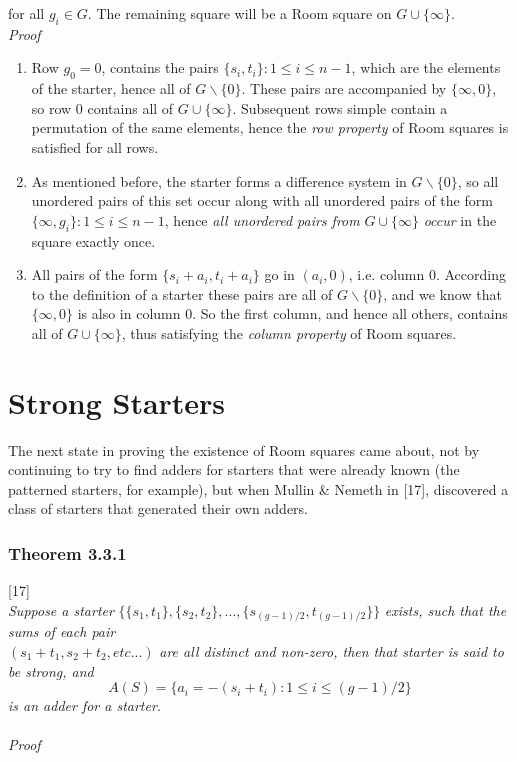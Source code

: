 \documentclass[
  12pt,
  a4paper]{book}
\begin{document}
for all \(g_i \in G\). The remaining square will be a Room square on
\(G \cup \{\infty\}\).\\
\emph{Proof}

\begin{enumerate}
\def\labelenumi{\arabic{enumi}.}
\item
  Row \(g_0=0\), contains the pairs \(\{s_i,t_i\}:1 \leq i \leq n-1\),
  which are the elements of the starter, hence all of
  \(G \backslash \{0\}\). These pairs are accompanied by
  \(\{\infty,0\}\), so row 0 contains all of \(G \cup \{\infty\}\).
  Subsequent rows simple contain a permutation of the same elements,
  hence the \emph{row property} of Room squares is satisfied for all
  rows.
\item
  As mentioned before, the starter forms a difference system in
  \(G \backslash \{0\}\), so all unordered pairs of this set occur along
  with all unordered pairs of the form
  \(\{\infty,g_i\}: 1 \leq i \leq n-1\), hence \emph{all unordered pairs
  from} \(G \cup \{\infty\}\) \emph{occur} in the square exactly once.
\item
  All pairs of the form \(\{s_i+a_i,t_i+a_i\}\) go in \((a_i,0)\), i.e.
  column 0. According to the definition of a starter these pairs are all
  of \(G \backslash \{0\}\), and we know that \(\{\infty,0\}\) is also
  in column 0. So the first column, and hence all others, contains all
  of \(G \cup \{\infty\}\), thus satisfying the \emph{column property}
  of Room squares.
\end{enumerate}

\hypertarget{strong-starters}{%
\section{Strong Starters}\label{strong-starters}}

The next state in proving the existence of Room squares came about, not
by continuing to try to find adders for starters that were already known
(the patterned starters, for example), but when Mullin \& Nemeth in
{[}17{]}, discovered a class of starters that generated their own
adders.

\hypertarget{theorem-3.3.1}{%
\subsubsection{Theorem 3.3.1}\label{theorem-3.3.1}}

{[}17{]}\\
\emph{Suppose a starter}
\(\{\{s_1,t_1\},\{s_2,t_2\},...,\{s_{(g-1)/2},t_{(g-1)/2}\}\}\)
\emph{exists, such that the sums of each pair}\\
\((s_1+t_1,s_2+t_2, etc...)\) \emph{are all distinct and non-zero, then
that starter is said to be strong, and}
\[A(S)=\{a_i = -(s_i+t_i):1 \leq i \leq (g-1)/2\}\] \emph{is an adder
for a starter.\\
~\\
Proof}
\end{document}

